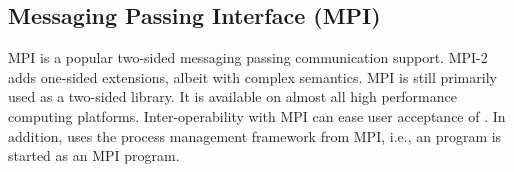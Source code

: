 \subsection{Messaging Passing Interface (MPI)}
MPI is a popular two-sided messaging passing communication
support. MPI-2 adds one-sided extensions, albeit with complex semantics. 
MPI is still primarily used as a two-sided library.
It is available on almost all high performance
computing platforms. Inter-operability with MPI can ease user
acceptance of \Xtenlib. In addition, \Xtenlib{} uses the process management
framework from MPI, i.e., an \Xtenlib{} program is started as an MPI
program.

